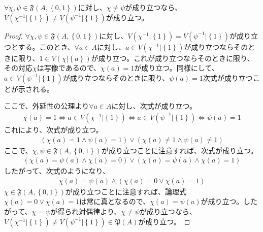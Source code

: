 \documentclass[dvipdfmx]{jsarticle}
\begin{document}
\begin{thm}\label{1.2.5.1c}
$\forall\chi,\psi \in \mathfrak{F}\left( A,\left\{ 0,1 \right\} \right)$に対し、$\chi \neq \psi $が成り立つなら、$V\left( \chi^{- 1}|\left\{ 1 \right\} \right) \neq V\left( \psi^{- 1}|\left\{ 1 \right\} \right) $が成り立つ。
\end{thm}
\begin{proof}
  $\forall\chi,\psi \in \mathfrak{F}\left( A,\left\{ 0,1 \right\} \right)$に対し、$V\left( \chi^{- 1}|\left\{ 1 \right\} \right)=V\left( \psi^{- 1}|\left\{ 1 \right\} \right)$が成り立つとする。このとき、$\forall a\in A$に対し、$a \in V\left( \chi^{- 1}|\left\{ 1 \right\} \right) $が成り立つならそのときに限り、$1 \in V\left( \chi|\left\{ a \right\} \right) $が成り立つ。これが成り立つならそのときに限り、その対応$\chi$は写像であるので、$\chi(a) = 1 $が成り立つ。同様にして、$a \in V\left( \psi^{- 1}|\left\{ 1 \right\} \right) $が成り立つならそのときに限り、$\psi(a) = 1$次式が成り立つことが示される。\par
  ここで、外延性の公理より$\forall a \in A$に対し、次式が成り立つ。
  \begin{align*}
  \chi(a) = 1 \Leftrightarrow a \in V\left( \chi^{- 1}|\left\{ 1 \right\} \right) \Leftrightarrow a \in V\left( \psi^{- 1}|\left\{ 1 \right\} \right) \Leftrightarrow \psi(a) = 1
  \end{align*}
  これにより、次式が成り立つ。
  \begin{align*}
  \left( \chi(a) = 1 \land \psi(a) = 1 \right) \vee \left( \chi(a) \neq 1 \land \psi(a) \neq 1 \right)
  \end{align*}
  ここで、$\chi,\psi \in \mathfrak{F}\left( A,\left\{ 0,1 \right\} \right)$が成り立つことに注意すれば、次式が成り立つ。
  \begin{align*}
  \left( \chi(a) = \psi(a) \land \chi(a) = 0 \right) \vee \left( \chi(a) = \psi(a) \land \chi(a) = 1 \right)
  \end{align*}
  したがって、次式のようになり、
  \begin{align*}
  \chi(a) = \psi(a) \land \left( \chi(a) = 0 \vee \chi(a) = 1 \right)
  \end{align*}
  $\chi \in \mathfrak{F}\left( A,\left\{ 0,1 \right\} \right)$が成り立つことに注意すれば、論理式$\chi(a) = 0 \vee \chi(a) = 1$は常に真となるので、$\chi(a) = \psi(a)$が成り立つ。したがって、$\chi = \psi$が得られ対偶律より、$\chi \neq \psi $が成り立つなら、$V\left( \chi^{- 1}|\left\{ 1 \right\} \right) \neq V\left( \psi^{- 1}|\left\{ 1 \right\} \right)\in \mathfrak{P}(A) $が成り立つ。
\end{proof}
\end{document}
